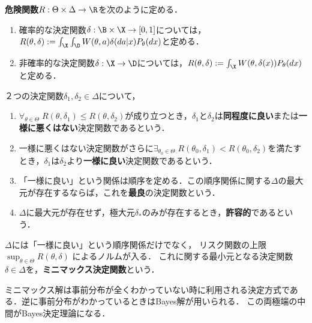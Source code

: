 \documentclass[uplatex,dvipdfmx]{jsreport}
\begin{document}
\begin{definition}
    \textbf{危険関数}$R:\Theta\times\Delta\to\R$を次のように定める．
    \begin{enumerate}
        \item 確率的な決定関数$\delta:\B\times\X\to[0,1]$については，$R(\theta,\delta):=\int_\X\int_\D W(\theta,a)\delta(da|x)P_\theta(dx)$と定める．
        \item 非確率的な決定関数$\delta:\X\to\D$については，$R(\theta,\delta):=\int_\X W(\theta,\delta(x))P_\theta(dx)$と定める．
    \end{enumerate}
\end{definition}

\begin{definition}
    ２つの決定関数$\delta_1,\delta_2\in\Delta$について，
    \begin{enumerate}
        \item $\forall_{\theta\in\Theta}\;R(\theta,\delta_1)\le R(\theta,\delta_2)$が成り立つとき，$\delta_1$と$\delta_2$は\textbf{同程度に良い}または\textbf{一様に悪くはない}決定関数であるという．
        \item 一様に悪くはない決定関数がさらに$\exists_{\theta_0\in\Theta}\;R(\theta_0,\delta_1)<R(\theta_0,\delta_2)$を満たすとき，$\delta_1$は$\delta_2$より\textbf{一様に良い}決定関数であるという．
        \item 「一様に良い」という関係は順序を定める．この順序関係に関する$\Delta$の最大元が存在するならば，これを\textbf{最良}の決定関数という．
        \item $\Delta$に最大元が存在せず，極大元$\delta_*$のみが存在するとき，\textbf{許容的}であるという．
    \end{enumerate}
\end{definition}

\begin{definition}
    $\Delta$には「一様に良い」という順序関係だけでなく，
    リスク関数の上限$\sup_{\theta\in\Theta}R(\theta,\delta)$
    によるノルムが入る．
    これに関する最小元となる決定関数$\delta\in\Delta$を，\textbf{ミニマックス決定関数}という．
\end{definition}
\begin{remarks}
    ミニマックス解は事前分布が全くわかっていない時に利用される決定方式である．逆に事前分布がわかっているときはBayes解が用いられる．
    この両極端の中間がBayes決定理論になる．
\end{remarks}
\end{document}
